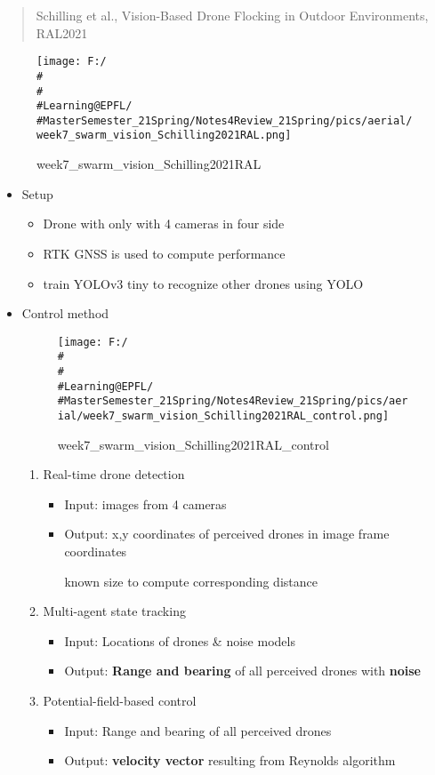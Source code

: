\documentclass[]{article}
\begin{document}
\begin{quote}
Schilling et al., Vision-Based Drone Flocking in Outdoor Environments,
RAL2021
\end{quote}

\begin{figure}
\centering
\texttt{[image: F:/\\\#\\\#\\\#Learning@EPFL/\\\#MasterSemester\_21Spring/Notes4Review\_21Spring/pics/aerial/week7\_swarm\_vision\_Schilling2021RAL.png]}
\caption{week7\_swarm\_vision\_Schilling2021RAL}
\end{figure}

\begin{itemize}
\item
  Setup

  \begin{itemize}
  \item
    Drone with only with 4 cameras in four side
  \item
    RTK GNSS is used to compute performance
  \item
    train YOLOv3 tiny to recognize other drones using YOLO
  \end{itemize}
\item
  Control method

  \begin{figure}
  \centering
  \texttt{[image: F:/\\\#\\\#\\\#Learning@EPFL/\\\#MasterSemester\_21Spring/Notes4Review\_21Spring/pics/aerial/week7\_swarm\_vision\_Schilling2021RAL\_control.png]}
  \caption{week7\_swarm\_vision\_Schilling2021RAL\_control}
  \end{figure}

  \begin{enumerate}
  \def\labelenumi{\arabic{enumi}.}
  \item
    Real-time drone detection

    \begin{itemize}
    \item
      Input: images from 4 cameras
    \item
      Output: x,y coordinates of perceived drones in image frame
      coordinates

      known size to compute corresponding distance
    \end{itemize}
  \item
    Multi-agent state tracking

    \begin{itemize}
    \item
      Input: Locations of drones \& noise models
    \item
      Output: \textbf{Range and bearing} of all perceived drones with
      \textbf{noise}
    \end{itemize}
  \item
    Potential-field-based control

    \begin{itemize}
    \item
      Input: Range and bearing of all perceived drones
    \item
      Output: \textbf{velocity vector} resulting from Reynolds algorithm
    \end{itemize}
  \end{enumerate}
\end{itemize}
\end{document}
